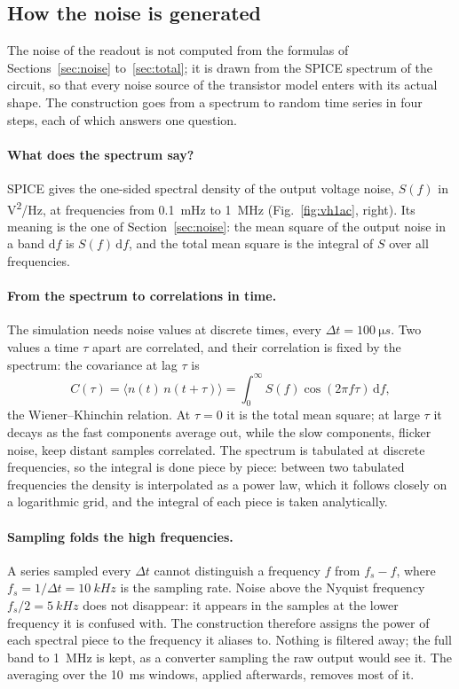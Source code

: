 \documentclass[11pt,a4paper]{article}
\newcommand{\dd}{\mathrm{d}}
\begin{document}
\subsection{How the noise is generated}
\label{sec:vh1noisegen}
%
The noise of the readout is not computed from the formulas of
Sections~\ref{sec:noise} to~\ref{sec:total}; it is drawn from the SPICE
spectrum of the circuit, so that every noise source of the transistor model
enters with its actual shape. The construction goes from a spectrum to
random time series in four steps, each of which answers one question.

\paragraph{What does the spectrum say?} SPICE gives the one-sided spectral
density of the output voltage noise, $S(f)$ in \si{V^2/Hz}, at frequencies
from \SI{0.1}{mHz} to \SI{1}{MHz} (Fig.~\ref{fig:vh1ac}, right). Its meaning
is the one of Section~\ref{sec:noise}: the mean square of the output noise in
a band $\dd f$ is $S(f)\,\dd f$, and the total mean square is the integral of
$S$ over all frequencies.

\paragraph{From the spectrum to correlations in time.} The simulation needs
noise values at discrete times, every $\Delta t=\SI{100}{\micro s}$. Two
values a time $\tau$ apart are correlated, and their correlation is fixed
by the spectrum: the covariance at lag $\tau$ is
\[
 C(\tau)=\langle n(t)\,n(t+\tau)\rangle=\int_0^\infty S(f)\cos(2\pi f\tau)\,\dd f ,
\]
the Wiener--Khinchin relation. At $\tau=0$ it is the total mean square;
at large $\tau$ it decays as the fast components average out, while the
slow components, flicker noise, keep distant samples correlated. The
spectrum is tabulated at discrete frequencies, so the integral is done piece
by piece: between two tabulated frequencies the density is interpolated as a
power law, which it follows closely on a logarithmic grid, and the integral
of each piece is taken analytically.

\paragraph{Sampling folds the high frequencies.} A series sampled every
$\Delta t$ cannot distinguish a frequency $f$ from $f_s-f$, where
$f_s=1/\Delta t=\SI{10}{kHz}$ is the sampling rate. Noise above the Nyquist
frequency $f_s/2=\SI{5}{kHz}$ does not disappear: it appears in the samples
at the lower frequency it is confused with. The construction therefore
assigns the power of each spectral piece to the frequency it aliases to.
Nothing is filtered away; the full band to \SI{1}{MHz} is kept, as a
converter sampling the raw output would see it. The averaging over the
\SI{10}{ms} windows, applied afterwards, removes most of it.
\end{document}
